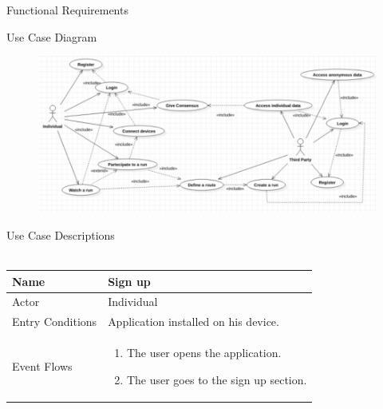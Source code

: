 \documentclass{article}
\begin{document}
\begin{legal}
\begin{legal}
    		\item Functional Requirements\\
    		\begin{legal}\bfseries
    		\item Use Case Diagram
    			\begin{figure}[H]
			  	\includegraphics[width=\linewidth]{./images/usecase.png}
				\end{figure}
				\item Use Case Descriptions\\\\
				\begin{tabular}{| m{3.5cm} | m{8cm}| }
				\hline
					Name & Sign up\\
				\hline
					Actor & Individual\\
				\hline
					Entry Conditions & Application installed
				on his device.\\
				\hline
					Event Flows & \begin{enumerate}
									\item The user opens the application.
									\item The user goes to the sign up section.
									

\end{enumerate}
\end{tabular}
\end{legal}
\end{legal}
\end{legal}
\end{document}
